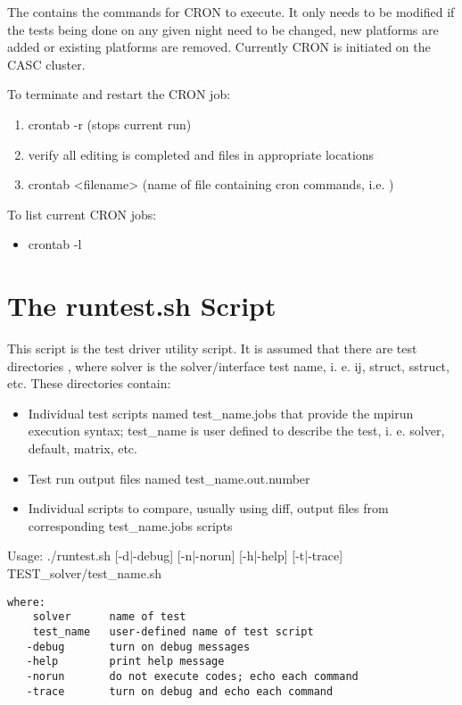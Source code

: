 The  contains the commands for CRON to execute.  It only needs to be modified
if the tests being done on any given night need to be changed, new platforms are added or 
existing platforms are removed.  Currently CRON is initiated on the CASC cluster.

To terminate and restart the CRON job:
\begin{enumerate}
\item crontab -r          (stops current run)
\item verify all editing is completed and files in appropriate locations
\item crontab <filename>  (name of file containing cron commands, i.e. )
\end{enumerate}

To list current CRON jobs:
\begin{itemize}
\item crontab -l 
\end{itemize}

\section{The runtest.sh Script}
\label{The runtest.sh Script}

This script is the test driver utility script.  It is assumed that there are 
test directories , where {solver} is the solver/interface
test name, i. e. ij, struct, sstruct, etc.  These directories contain:
\begin{itemize}
\item Individual test scripts named {test\_name}.jobs that provide the mpirun
execution syntax; {test\_name} is user defined to describe the test, i. e. solver, 
default, matrix, etc.
\item Test run output files named {test\_name}.out.{number}
\item Individual scripts to compare, usually using diff, output files from
corresponding {test\_name}.jobs scripts
\end{itemize}

Usage:
./runtest.sh [-d|-debug] [-n|-norun] [-h|-help] [-t|-trace] TEST\_solver/test\_name.sh

\begin{verbatim}
where:
    solver      name of test
    test_name   user-defined name of test script
   -debug       turn on debug messages
   -help        print help message
   -norun       do not execute codes; echo each command
   -trace       turn on debug and echo each command
\end{verbatim}


